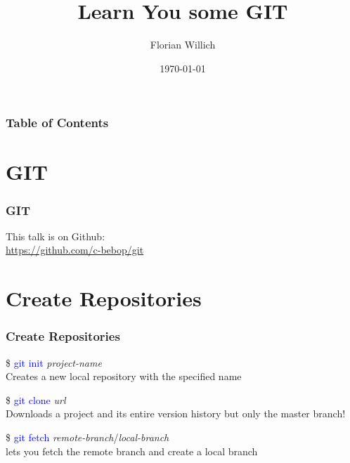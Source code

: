 \documentclass[aspectratio=169]{beamer}
\title[Learn You some GIT] %
{Learn You some GIT}
\author[Florian Willich]{Florian Willich}
\institute[BIT]
{
  Quality and Usability Lab\\
  Berlin Institute of Technology
}
\date{\today}
\begin{document}
\frame{\titlepage}

\begin{frame}
\frametitle{Table of Contents}
\tableofcontents
\end{frame}

\section{GIT}
\begin{frame}

\frametitle{GIT}

This talk is on Github:\\
\hyperlink{https://github.com/c-bebop/git}{https://github.com/c-bebop/git}

\end{frame}

\section{Create Repositories}
\begin{frame}

\frametitle{Create Repositories}

\$ \textcolor{blue}{git init} \textit{project-name}\\
Creates a new local repository with the specified name

\pause

\$ \textcolor{blue}{git clone} \textit{url}\\
Downloads a project and its entire version history but only the master branch!

\pause

\$ \textcolor{blue}{git fetch} \textit{remote-branch}/\textit{local-branch}\\
lets you fetch the remote branch and create a local branch

\end{frame}
\end{document}
